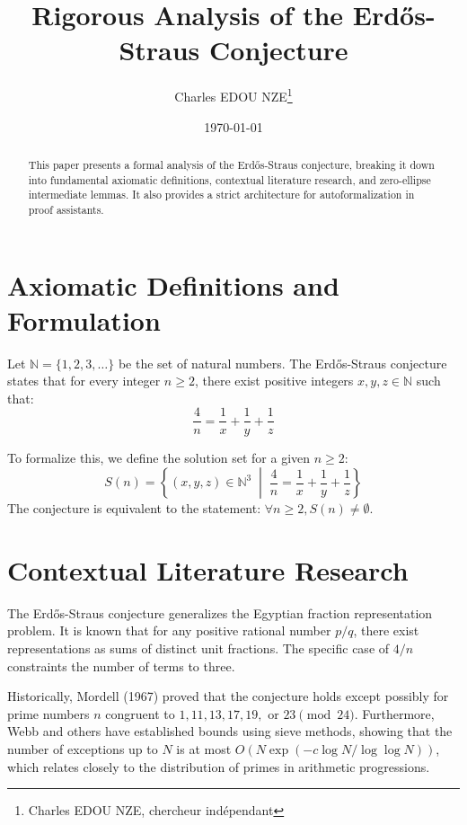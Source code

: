 \documentclass[12pt]{article}
\title{Rigorous Analysis of the Erd\H{o}s-Straus Conjecture}
\author{Charles EDOU NZE\thanks{Charles EDOU NZE, chercheur indépendant}}
\date{\today}
\begin{document}
\maketitle

\begin{abstract}
This paper presents a formal analysis of the Erd\H{o}s-Straus conjecture, breaking it down into fundamental axiomatic definitions, contextual literature research, and zero-ellipse intermediate lemmas. It also provides a strict architecture for autoformalization in proof assistants.
\end{abstract}

\section{Axiomatic Definitions and Formulation}
Let $\mathbb{N} = \{1, 2, 3, \ldots\}$ be the set of natural numbers.
The Erd\H{o}s-Straus conjecture states that for every integer $n \ge 2$, there exist positive integers $x, y, z \in \mathbb{N}$ such that:
\begin{equation}
\frac{4}{n} = \frac{1}{x} + \frac{1}{y} + \frac{1}{z}
\end{equation}

To formalize this, we define the solution set for a given $n \ge 2$:
\begin{equation}
S(n) = \left\{ (x, y, z) \in \mathbb{N}^3 \;\middle|\; \frac{4}{n} = \frac{1}{x} + \frac{1}{y} + \frac{1}{z} \right\}
\end{equation}
The conjecture is equivalent to the statement: $\forall n \ge 2, S(n) \neq \emptyset$.

\section{Contextual Literature Research}
The Erd\H{o}s-Straus conjecture generalizes the Egyptian fraction representation problem. It is known that for any positive rational number $p/q$, there exist representations as sums of distinct unit fractions. The specific case of $4/n$ constraints the number of terms to three.

Historically, Mordell (1967) proved that the conjecture holds except possibly for prime numbers $n$ congruent to $1, 11, 13, 17, 19, \text{ or } 23 \pmod{24}$. Furthermore, Webb and others have established bounds using sieve methods, showing that the number of exceptions up to $N$ is at most $O(N \exp(-c \log N / \log \log N))$, which relates closely to the distribution of primes in arithmetic progressions.
\end{document}
